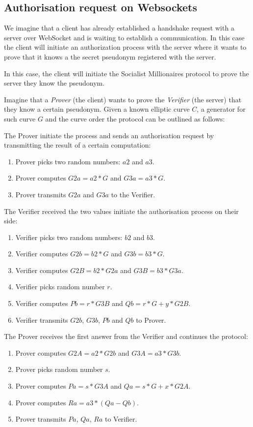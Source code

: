\subsection{Authorisation request on Websockets}

We imagine that a client has already established a handshake request with a server over WebSocket and is waiting to establish a communication. In this case the client will initiate an authorization process with the server where it wants to prove that it knows a the secret pseudonym registered with the server.

In this case, the client will initiate the Socialist Millionaires protocol to prove the server they know the pseudonym.

Imagine that a \emph{Prover} (the client) wants to prove the \emph{Verifier} (the server) that they know a certain pseudonym. Given a known elliptic curve $C$, a generator for such curve $G$ and the curve order the protocol can be outlined as follows:

The Prover initiate the process and sends an authorisation request by transmitting the result of a certain computation:
\begin{enumerate}
    \item Prover picks two random numbers: $a2$ and $a3$.
    \item Prover computes $G2a = a2 * G$ and $G3a = a3 * G$.
    \item Prover transmits $G2a$ and $G3a$ to the Verifier.
\end{enumerate}

The Verifier received the two values initiate the authorisation process on their side:
\begin{enumerate}
    \item Verifier picks two random numbers: $b2$ and $b3$. 
    \item Verifier computes $G2b = b2 * G$ and $G3b = b3 * G$.
    \item Verifier computes $G2B = b2 * G2a$ and $G3B = b3 * G3a$.
    \item Verifier picks random number $r$.
    \item Verifier computes $Pb = r * G3B$ and $Qb = r * G + y * G2B$.
    \item Verifier transmits $G2b$, $G3b$, $Pb$ and $Qb$ to Prover.
\end{enumerate}

The Prover receives the first answer from the Verifier and continues the protocol:
\begin{enumerate}
    \item Prover computes $G2A = a2 * G2b$ and $G3A = a3 * G3b$.
    \item Prover picks random number $s$.
    \item Prover computes $Pa = s * G3A$ and $Qa = s * G + x * G2A$.
    \item Prover computes $Ra = a3 * (Qa - Qb)$.
    \item Prover transmits $Pa$, $Qa$, $Ra$ to Verifier.
\end{enumerate}

